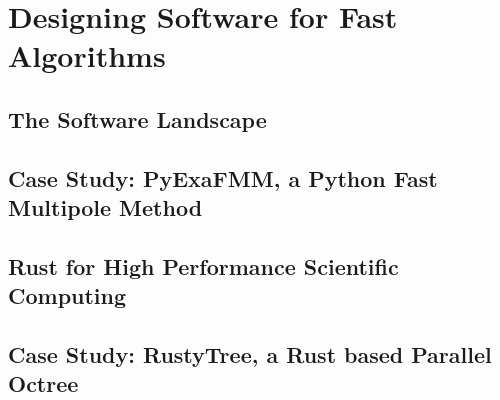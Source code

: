 \chapter{Designing Software for Fast Algorithms}\label{chpt:2}


\section{The Software Landscape}\label{sec:2_1}


\section{Case Study: PyExaFMM, a Python Fast Multipole Method}\label{sec:2_2}


\section{Rust for High Performance Scientific Computing}\label{sec:2_3}


\section{Case Study: RustyTree, a Rust based Parallel Octree}\label{sec:2_4}


